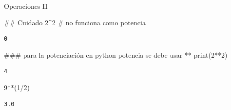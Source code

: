 \documentclass[
  ignorenonframetext,
  aspectratio=169,
  spanish,
]{beamer}
\newenvironment{Shaded}{\begin{snugshade}}{\end{snugshade}}
\newcommand{\BuiltInTok}[1]{\textcolor[rgb]{0.00,0.23,0.31}{#1}}
\newcommand{\CommentTok}[1]{\textcolor[rgb]{0.37,0.37,0.37}{#1}}
\newcommand{\DecValTok}[1]{\textcolor[rgb]{0.68,0.00,0.00}{#1}}
\newcommand{\NormalTok}[1]{\textcolor[rgb]{0.00,0.23,0.31}{#1}}
\newcommand{\OperatorTok}[1]{\textcolor[rgb]{0.37,0.37,0.37}{#1}}
\begin{document}
\begin{frame}[fragile]{Operaciones II}
\label{operaciones-ii}
\begin{Shaded}
\begin{Highlighting}[]
\CommentTok{\#\# Cuidado }
\DecValTok{2}\OperatorTok{\^{}}\DecValTok{2} \CommentTok{\# no funciona como potencia     }
\end{Highlighting}
\end{Shaded}

\begin{verbatim}
0
\end{verbatim}

\begin{Shaded}
\begin{Highlighting}[]
\CommentTok{\#\#\# para la potenciación en python potencia se debe usar **}
\BuiltInTok{print}\NormalTok{(}\DecValTok{2}\OperatorTok{**}\DecValTok{2}\NormalTok{)}
\end{Highlighting}
\end{Shaded}

\begin{verbatim}
4
\end{verbatim}

\begin{Shaded}
\begin{Highlighting}[]
\DecValTok{9}\OperatorTok{**}\NormalTok{(}\DecValTok{1}\OperatorTok{/}\DecValTok{2}\NormalTok{) }
\end{Highlighting}
\end{Shaded}

\begin{verbatim}
3.0
\end{verbatim}
\end{frame}
\end{document}
